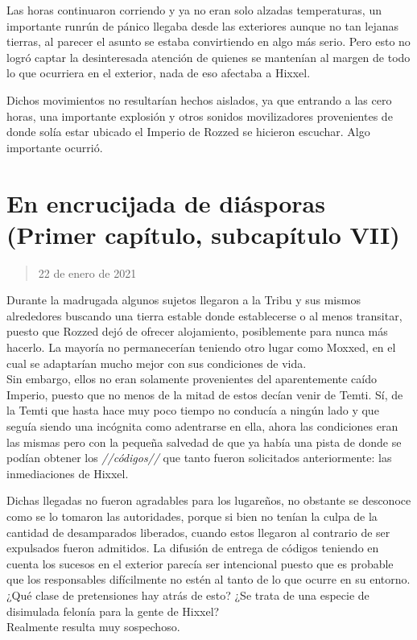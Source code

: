 \documentclass[
  spanish,
]{book}
\begin{document}
Las horas continuaron corriendo y ya no eran solo alzadas temperaturas, un importante runrún de pánico llegaba desde las exteriores aunque no tan lejanas tierras, al parecer el asunto se estaba convirtiendo en algo más serio. Pero esto no logró captar la desinteresada atención de quienes se mantenían al margen de todo lo que ocurriera en el exterior, nada de eso afectaba a Hixxel.

Dichos movimientos no resultarían hechos aislados, ya que entrando a las cero horas, una importante explosión y otros sonidos movilizadores provenientes de donde solía estar ubicado el Imperio de Rozzed se hicieron escuchar. Algo importante ocurrió.

\hypertarget{en-encrucijada-de-diuxe1sporas-primer-capuxedtulo-subcapuxedtulo-vii}{%
\section{En encrucijada de diásporas (Primer capítulo, subcapítulo VII)}\label{en-encrucijada-de-diuxe1sporas-primer-capuxedtulo-subcapuxedtulo-vii}}

\begin{quote}
22 de enero de 2021
\end{quote}

Durante la madrugada algunos sujetos llegaron a la Tribu y sus mismos alrededores buscando una tierra estable donde establecerse o al menos transitar, puesto que Rozzed dejó de ofrecer alojamiento, posiblemente para nunca más hacerlo. La mayoría no permanecerían teniendo otro lugar como Moxxed, en el cual se adaptarían mucho mejor con sus condiciones de vida.\\
Sin embargo, ellos no eran solamente provenientes del aparentemente caído Imperio, puesto que no menos de la mitad de estos decían venir de Temti. Sí, de la Temti que hasta hace muy poco tiempo no conducía a ningún lado y que seguía siendo una incógnita como adentrarse en ella, ahora las condiciones eran las mismas pero con la pequeña salvedad de que ya había una pista de donde se podían obtener los \emph{//códigos//} que tanto fueron solicitados anteriormente: las inmediaciones de Hixxel.

Dichas llegadas no fueron agradables para los lugareños, no obstante se desconoce como se lo tomaron las autoridades, porque si bien no tenían la culpa de la cantidad de desamparados liberados, cuando estos llegaron al contrario de ser expulsados fueron admitidos. La difusión de entrega de códigos teniendo en cuenta los sucesos en el exterior parecía ser intencional puesto que es probable que los responsables difícilmente no estén al tanto de lo que ocurre en su entorno. ¿Qué clase de pretensiones hay atrás de esto? ¿Se trata de una especie de disimulada felonía para la gente de Hixxel?\\
Realmente resulta muy sospechoso.
\end{document}
